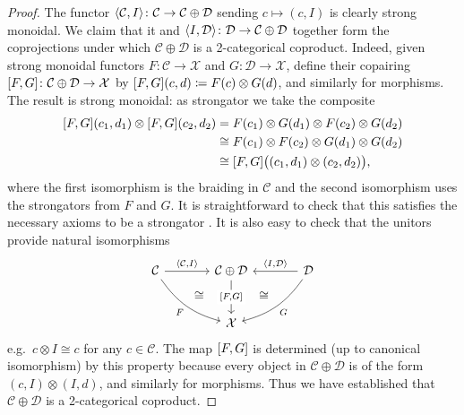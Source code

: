 \documentclass[11pt, oneside, article]{memoir}
\theoremstyle{plain}
\theoremstyle{definition}
\theoremstyle{remark}
\newcommand{\cat}[1]{\mathcal{#1}}%
\DeclarePairedDelimiter{\pair}{\langle}{\rangle}
\DeclarePairedDelimiter{\copair}{[}{]}
\newcommand{\hide}[2][]{#1}
\begin{document}
\begin{proof}
The functor $\pair{\cat{C},I}\colon\cat{C}\to\cat{C}\oplus\cat{D}$ sending $c\mapsto (c,I)$ is clearly strong monoidal. We claim that it and $\pair{I,\cat{D}}\colon\cat{D}\to\cat{C}\oplus\cat{D}$ together form the coprojections under which $\cat{C}\oplus\cat{D}$ is a 2-categorical coproduct. Indeed, given strong monoidal functors $F\colon\cat{C}\to\cat{X}$ and $G\colon\cat{D}\to\cat{X}$, define their copairing $\copair{F,G}\colon\cat{C}\oplus\cat{D}\to\cat{X}$ by $\copair{F,G}(c,d)\coloneqq F(c)\otimes G(d)$, and similarly for morphisms. The result is strong monoidal: as strongator we take the composite
\begin{align*}
	\copair{F,G}(c_1,d_1)\otimes\copair{F,G}(c_2,d_2)&=
	F(c_1)\otimes G(d_1)\otimes F(c_2)\otimes G(d_2)\\&\cong
	F(c_1)\otimes F(c_2)\otimes G(d_1)\otimes G(d_2)\\&\cong
	\copair{F,G}\big((c_1,d_1)\otimes(c_2,d_2)\big),
\end{align*}
where the first isomorphism is the braiding in $\cat{C}$ and the second isomorphism uses the strongators from $F$ and $G$. It is straightforward to check that this satisfies the necessary axioms to be a strongator%
\hide[.]{
, e.g.\ the commutativity of the following diagram
\[
\begin{tikzcd}
	Fc_1\otimes Gd_1\otimes Fc_2\otimes Gd_2\otimes Fc_3\otimes Gd_3\ar[r, "\sigma"]\ar[d, "\sigma"']&
	Fc_1\otimes Gd_1\otimes Fc_2\otimes Fc_3\otimes Gd_2\otimes Gd_3\ar[d]\\
	Fc_1\otimes Fc_2\otimes Gc_1\otimes Gc_2\otimes Fc_3\otimes Gd_3\ar[d]&
	Fc_1\otimes Gd_1\otimes F(c_2\otimes c_3)\otimes G(d_2\otimes d_3)\ar[d, "\sigma"]\\
	F(c_1\otimes c_2)\otimes G(d_1\otimes d_2)\otimes Fc_3\otimes Gd_3\ar[d, "\sigma"']&
	Fc_1\otimes F(c_2\otimes c_3)\otimes Gd_1\otimes G(d_2\otimes d_3)\ar[d]\\
	F(c_1\otimes c_2)\otimes Fc_3\otimes G(d_1\otimes d_2)\otimes Gd_3\ar[r]&
	F(c_1\otimes c_2\otimes c_3)\otimes G(d_1\otimes d_2\otimes d_3)	
\end{tikzcd}
\]
}
It is also easy to check that the unitors provide natural isomorphisms
\begin{equation}\label{eqn.coproduct_smc}
\begin{tikzcd}[sep=large]
	\cat{C}\ar[r, "\pair{\cat{C},I}"]\ar[dr, bend right=20pt, "F"', "" name=F]&
	|[alias=CD]|\cat{C}\oplus\cat{D}\ar[d, "\copair{F,G}" description]&
	\cat{D}\ar[l, "\pair{I,\cat{D}}"']\ar[dl, bend left=20pt, "G", ""' name=G]\\&
	\cat{X}
	\ar[from=G, to=CD, phantom, near start, "\cong"]
	\ar[from=F, to=CD, phantom, near start, "\cong"]
\end{tikzcd}
\end{equation}
e.g.\ $c\otimes I\cong c$ for any $c\in\cat{C}$. The map $\copair{F,G}$ is determined (up to canonical isomorphism) by this property because every object in $\cat{C}\oplus\cat{D}$ is of the form $(c,I)\otimes(I,d)$, and similarly for morphisms. Thus we have established that $\cat{C}\oplus\cat{D}$ is a 2-categorical coproduct.


\end{proof}
\end{document}
